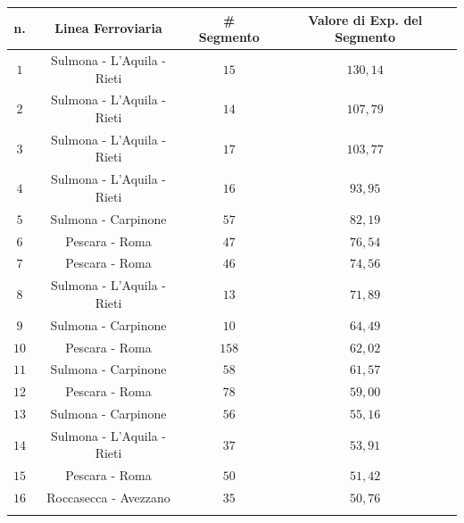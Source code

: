 \begin{table}[hpt]
\centering
\begin{tabular}{|c|c|c|c|}
\hline
\rowcolor{lightgray}
n. & Linea Ferroviaria          & \# Segmento & Valore di Exp. del Segmento \\ \hline \rowcolor{flamingopink}
$1$  & Sulmona - L'Aquila - Rieti & $15$        & $130,14$                    \\ \hline \rowcolor{flamingopink}
$2$  & Sulmona - L'Aquila - Rieti & $14$        & $107,79$                    \\ \hline \rowcolor{flamingopink}
$3$  & Sulmona - L'Aquila - Rieti & $17$        & $103,77$                    \\ \hline \rowcolor{flamingopink}
$4$  & Sulmona - L'Aquila - Rieti & $16$        & $93,95$                     \\ \hline \rowcolor{flamingopink}
$5$  & Sulmona - Carpinone        & $57$        & $82,19$                     \\ \hline \rowcolor{flamingopink}
$6$  & Pescara - Roma             & $47$        & $76,54$                     \\ \hline \rowcolor{flamingopink}
$7$  & Pescara - Roma             & $46$        & $74,56$                     \\ \hline \rowcolor{flamingopink}
$8$  & Sulmona - L'Aquila - Rieti & $13$        & $71,89$                     \\ \hline \rowcolor{flamingopink}
$9$  & Sulmona - Carpinone        & $10$        & $64,49$                     \\ \hline \rowcolor{flamingopink}
$10$ & Pescara - Roma             & $158$       & $62,02$                     \\ \hline \rowcolor{flamingopink}
$11$ & Sulmona - Carpinone        & $58$        & $61,57$                     \\ \hline \rowcolor{flamingopink}
$12$ & Pescara - Roma             & $78$        & $59,00$                     \\ \hline \rowcolor{flamingopink}
$13$ & Sulmona - Carpinone        & $56$        & $55,16$                     \\ \hline \rowcolor{flamingopink}
$14$ & Sulmona - L'Aquila - Rieti & $37$        & $53,91$                     \\ \hline \rowcolor{flamingopink}
$15$ & Pescara - Roma             & $50$        & $51,42$                     \\ \hline \rowcolor{flamingopink}
$16$ & Roccasecca - Avezzano      & $35$        & $50,76$                     \\ \hline \rowcolor{flamingopink}

\end{tabular}
\end{table}
